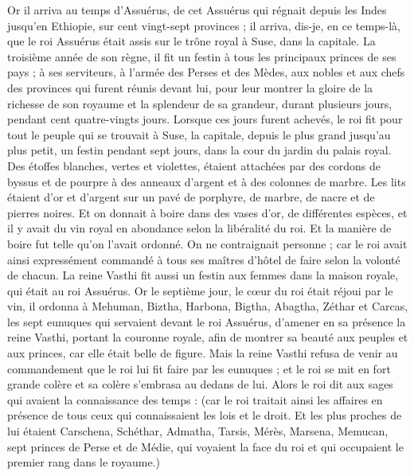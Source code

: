 \begin{multicols}{2}
\VerseOne{}Or il arriva au temps d'Assuérus, de cet Assuérus qui régnait depuis les Indes jusqu'en Ethiopie, sur cent vingt-sept provinces ;
il arriva, dis-je, en ce temps-là, que le roi Assuérus était assis sur le trône royal à Suse, dans la capitale.
La troisième année de son règne, il fit un festin à tous les principaux princes de ses pays ; à ses serviteurs, à l'armée des Perses et des Mèdes, aux nobles et aux chefs des provinces qui furent réunis devant lui,
pour leur montrer la gloire de la richesse de son royaume et la splendeur de sa grandeur, durant plusieurs jours, pendant cent quatre-vingts jours.
Lorsque ces jours furent achevés, le roi fit pour tout le peuple qui se trouvait à Suse, la capitale, depuis le plus grand jusqu'au plus petit, un festin pendant sept jours, dans la cour du jardin du palais royal.
Des étoffes blanches, vertes et violettes, étaient attachées par des cordons de byssus et de pourpre à des anneaux d'argent et à des colonnes de marbre. Les lits étaient d'or et d'argent sur un pavé de porphyre, de marbre, de nacre et de pierres noires.
Et on donnait à boire dans des vases d'or, de différentes espèces, et il y avait du vin royal en abondance selon la libéralité du roi.
Et la manière de boire fut telle qu'on l'avait ordonné. On ne contraignait personne ; car le roi avait ainsi expressément commandé à tous ses maîtres d'hôtel de faire selon la volonté de chacun.
La reine Vasthi fit aussi un festin aux femmes dans la maison royale, qui était au roi Assuérus.
Or le septième jour, le cœur du roi était réjoui par le vin, il ordonna à Mehuman, Biztha, Harbona, Bigtha, Abagtha, Zéthar et Carcas, les sept eunuques qui servaient devant le roi Assuérus,
d'amener en sa présence la reine Vasthi, portant la couronne royale, afin de montrer sa beauté aux peuples et aux princes, car elle était belle de figure.
Mais la reine Vasthi refusa de venir au commandement que le roi lui fit faire par les eunuques ; et le roi se mit en fort grande colère et sa colère s'embrasa au dedans de lui.
Alors le roi dit aux sages qui avaient la connaissance des temps : (car le roi traitait ainsi les affaires en présence de tous ceux qui connaissaient les lois et le droit.
Et les plus proches de lui étaient Carschena, Schéthar, Admatha, Tarsis, Mérès, Marsena, Memucan, sept princes de Perse et de Médie, qui voyaient la face du roi et qui occupaient le premier rang dans le royaume.)

\end{multicols}
